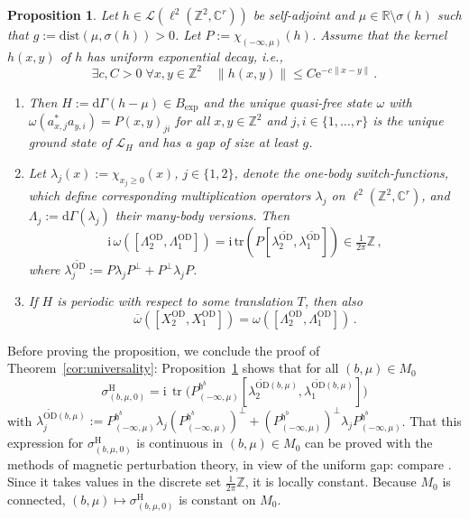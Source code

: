 \documentclass[a4paper]{article}
\newcommand{\tr}{\mathrm{tr}}
\newcommand{\e}{\mathrm{e}}
\renewcommand{\i}{\mathrm{i}}
\newcommand{\fd}{r}
\newcommand{\w}{\omega}
\newcommand{\Z}{\mathbb{Z}}
\newcommand{\C}{\mathbb{C}}
\newcommand{\R}{\mathbb{R}}
\newcommand{\OD}[1][]{   ^{\mathrm{OD}#1}   }
\newcommand{\ODT}[1][]{   ^{\widetilde{\mathrm{OD}}#1}   }
\newcommand{\mL}{\mathcal{L}}
\newcommand{\dd}{\mathrm{d}}
\theoremstyle{plain}
\newtheorem{proposition}[theorem]{Proposition}
\theoremstyle{definition}
\theoremstyle{remark}
\renewcommand{\(}{\left(}
\renewcommand{\)}{\right)}
\begin{document}
\begin{proposition}\label{prop:dcformulas}
 Let $h\in\mL(\ell^2(\Z^2,\C^\fd))$ be self-adjoint  and $\mu\in\R\setminus\sigma(h)$ such that $g:= \mathrm{dist}(\mu,\sigma(h))>0$.  Let $P:= \chi_{(-\infty,\mu)}(h)$. Assume that the kernel $h(x,y)$ of $h$ has uniform exponential decay, i.e.,
 \begin{equation}\label{hexp}
 \exists c,C>0\;\forall x,y\in\Z^2\quad \|h(x,y)\|\leq C\e^{-c\|x-y\|}\,.
 \end{equation}

\begin{enumerate}
    \item[(i)] 
 Then $H:=\dd\Gamma(h-\mu)\in B_{\exp}$ and the unique quasi-free state $\w$ with $\w(a^*_{x,j}a_{y,i}) = P(x,y)_{ji}$   for all $x,y\in\Z^2$ and $j,i\in\{1,\ldots,\fd\}$ is the unique ground state of $\mL_{H}$ and has a gap of size at least $g$.
\item[(ii)] 
Let $\lambda_j(x):= \chi_{x_j\geq 0}(x)$, $j\in\{1,2\}$,  denote the one-body switch-functions, which define  corresponding multiplication operators $\lambda_j$ on $\ell^2(\Z^2,\C^\fd)$, and $\Lambda_j := \dd\Gamma(\lambda_j)$ their many-body versions. Then
 \[
\i\,\w([\Lambda_2\OD,\Lambda_1\OD]) = \i\,\tr (P [\lambda_2\ODT,\lambda_1\ODT]) \in \tfrac{1}{2\pi} \Z\,,
 \]
 where $\lambda_j\ODT := P\lambda_jP^\perp +P^\perp\lambda_jP $.
\item[(iii)] 
 If $H$ is periodic with respect to some translation $T$, then also
 \[ \overline\w([X_2\OD,X_1\OD])=\w([\Lambda_2\OD,\Lambda_1\OD])\,.
 \]
 \end{enumerate}
\end{proposition}

Before proving the proposition, we conclude the proof of Theorem~\ref{cor:universality}: Proposition~\ref{prop:dcformulas} shows that for all $(b,\mu)\in M_0$  
\[
\sigma^\mathrm H_{(b,\mu,0)}
=
\mathrm i\,\operatorname{tr}
\bigl(
P^{\mathfrak{h}^b}_{(-\infty,\mu)}
[\lambda_2\ODT[(b,\mu)],
\lambda_1\ODT[(b,\mu)]]
\bigr)
\]
with $\lambda_j\ODT[(b,\mu)]:= P^{\mathfrak{h}^b}_{(-\infty,\mu)} \lambda_j (P^{\mathfrak{h}^b}_{(-\infty,\mu)})^\perp +  (P^{\mathfrak{h}^b}_{(-\infty,\mu)})^\perp \lambda_j P^{\mathfrak{h}^b}_{(-\infty,\mu)}$.
That this expression for $\sigma^\mathrm H_{(b,\mu,0)}$ is continuous in $(b,\mu)\in M_0$ can be proved with the methods of magnetic perturbation theory, in view of the uniform gap: compare \cite[Sec.~2.1.2]{cornean2021beyond}. Since it takes values in the discrete set $\frac1{2\pi}\mathbb Z$, it is locally constant. Because $M_0$ is connected, $(b,\mu)\mapsto \sigma^\mathrm H_{(b,\mu,0)}$ is constant on $M_0$. 
\end{document}
